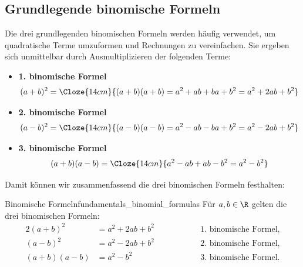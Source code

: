 \subsection{Grundlegende binomische Formeln}
\label{subsec:fundamentals_basic_binomial_formulas}

Die drei grundlegenden binomischen Formeln werden häufig verwendet, um quadratische Terme
umzuformen und Rechnungen zu vereinfachen. Sie ergeben sich unmittelbar durch Ausmultiplizieren der
folgenden Terme:

\label{subsubsec:fundamentals_first_binomial_formula}
\begin{itemize}[leftmargin=*,itemsep=0.8em]
  \item
    \begin{minipage}[t]{\linewidth}
      \textbf{1. binomische Formel}
      \[
        (a+b)^2=
        \Cloze{14cm}{(a+b)(a+b)=a^2+ab+ba+b^2=a^2+2ab+b^2}
      \]
    \end{minipage}

  \label{subsubsec:fundamentals_second_binomial_formula}
  \item
    \begin{minipage}[t]{\linewidth}
      \textbf{2. binomische Formel}
      \[
        (a-b)^2=
        \Cloze{14cm}{(a-b)(a-b)=a^2-ab-ba+b^2=a^2-2ab+b^2}
      \]
    \end{minipage}

  \label{subsubsec:fundamentals_third_binomial_formula}
  \item
    \begin{minipage}[t]{\linewidth}
      \textbf{3. binomische Formel}
      \[
        (a+b)(a-b)=
        \Cloze{14cm}{a^2-ab+ab-b^2=a^2-b^2}
      \]
    \end{minipage}
\end{itemize}

Damit können wir zusammenfassend die drei binomischen Formeln festhalten:
\begin{TheoremBox}{Binomische Formeln}{fundamentals_binomial_formulas}
  Für $a,b\in\R$ gelten die drei binomischen Formeln:
  \begin{alignat*}{2}
    (a+b)^2&=a^2+2ab+b^2
      &\qquad\qquad&\text{1. binomische Formel},\\[0.5em]
    (a-b)^2&=a^2-2ab+b^2
      &\qquad\qquad&\text{2. binomische Formel},\\[0.5em]
    (a+b)(a-b)&=a^2-b^2
      &\qquad\qquad&\text{3. binomische Formel}.
  \end{alignat*}
\end{TheoremBox}


